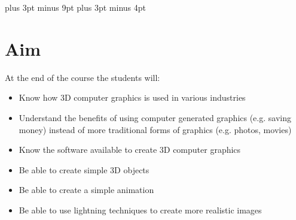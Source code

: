 \documentclass[11pt,a4paper]{report}
\begin{document}
\belowdisplayskip=12pt plus 3pt minus 9pt
\belowdisplayshortskip=7pt plus 3pt minus 4pt


% 
% 
% 
% 
% 
% 


\section*{Aim}

At the end of the course the students will:
\begin{itemize}
 \item Know how 3D computer graphics is used in various industries
 \item Understand the benefits of using computer generated graphics (e.g. saving money) instead of more traditional forms of graphics (e.g. photos, movies)
 \item Know the software available to create 3D computer graphics
 \item Be able to create simple 3D objects
 \item Be able to create a simple animation
 \item Be able to use lightning techniques to create more realistic images
\end{itemize}
\end{document}
